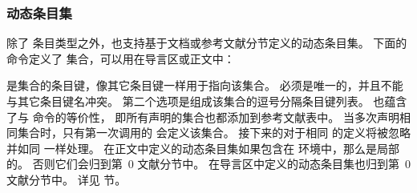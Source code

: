 \subsubsection{动态条目集}%
\label{use:bib:set}


除了  条目类型之外，\biblatex 也支持基于文档或参考文献分节定义的动态条目集。
下面的命令定义了  集合，可以用在导言区或正文中：

\begin{ltxsyntax}



 是集合的条目键，像其它条目键一样用于指向该集合。
 必须是唯一的，并且不能与其它条目键名冲突。
第二个选项是组成该集合的逗号分隔条目键列表。
 也蕴含了与  命令的等价性，
即所有声明的集合也都添加到参考文献表中。
当多次声明相同集合时，只有第一次调用的  会定义该集合。
接下来的对于相同  的定义将被忽略并如同  一样处理。
在正文中定义的动态条目集如果包含在  环境中，那么是局部的。
否则它们会归到第~0 文献分节中。
在导言区中定义的动态条目集也归到第~0 文献分节中。
详见  节。

\end{ltxsyntax}

